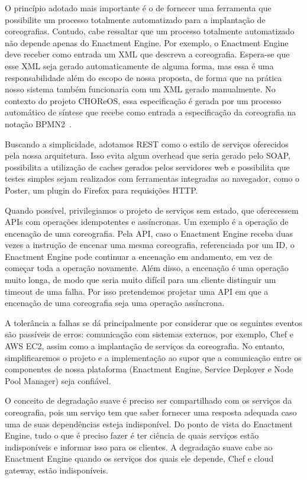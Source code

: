 O princípio adotado mais importante é o de fornecer uma ferramenta que possibilite um processo totalmente automatizado para a implantação de coreografias. Contudo, cabe ressaltar que um processo totalmente automatizado não depende apenas do Enactment Engine. Por exemplo, o Enactment Engine deve receber como entrada um XML que descreva a coreografia. Espera-se que esse XML seja gerado automaticamente de alguma forma, mas essa é uma responsabilidade além do escopo de nossa proposta, de forma que na prática nosso sistema também funcionaria com um XML gerado manualmente. No contexto do projeto CHOReOS, essa especificação é gerada por um processo automático de síntese que recebe como entrada a especificação da coreografia na notação BPMN2~\cite{Autili2013Synthesis}.

Buscando a simplicidade, adotamos REST como o estilo de serviços oferecidos pela nossa arquitetura. Isso evita algum overhead que seria gerado pelo SOAP, possibilita a utilização de caches gerados pelos servidores web e possibilita que testes simples sejam realizados com ferramentas integradas ao navegador, como o Poster, um plugin do Firefox para requisições HTTP.

Quando possível, privilegiamos o projeto de serviços sem estado, que oferecessem APIs com operações idempotentes e assíncronas. Um exemplo é a operação de encenação de uma coreografia. Pela API, caso o Enactment Engine receba duas vezes a instrução de encenar uma mesma coreografia, referenciada por um ID, o Enactment Engine pode continuar a encenação em andamento, em vez de começar toda a operação novamente. Além disso, a encenação é uma operação muito longa, de modo que seria muito difícil para um cliente distinguir um timeout de uma falha. Por isso pretendemos projetar uma API em que a encenação de uma coreografia seja uma operação assíncrona.

A tolerância a falhas se dá principalmente por considerar que os seguintes eventos são passíveis de erros: comunicação com sistemas externos, por exemplo, Chef e AWS EC2, assim como a implantação de serviços da coreografia. No entanto, simplificaremos o projeto e a implementação ao supor que a comunicação entre os componentes de nossa plataforma (Enactment Engine, Service Deployer e Node Pool Manager) seja confiável. 

O conceito de degradação suave é preciso ser compartilhado com os serviços da coreografia, pois um serviço tem que saber fornecer uma resposta adequada caso uma de suas dependências esteja indisponível. Do ponto de vista do Enactment Engine, tudo o que é preciso fazer é ter ciência de quais serviços estão indisponíveis e informar isso para os clientes. A degradação suave cabe ao Enactment Engine quando os serviços dos quais ele depende, Chef e cloud gateway, estão indisponíveis.

